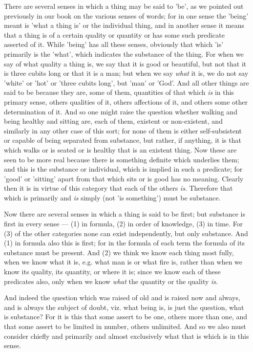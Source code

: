 There are several senses in which a thing may be said to 'be', as we pointed out previously in our book on the various senses of words; for in one sense the 'being' meant is 'what a thing is' or the individual thing, and in another sense it means that a thing is of a certain quality or quantity or has some such predicate asserted of it. While 'being' has all these senses, obviously that which 'is' primarily is the 'what', which indicates the substance of the thing. For when we say of what quality a thing is, we say that it is good or beautiful, but not that it is three cubits long or that it is a man; but when we say \emph{what} it is, we do not say 'white' or 'hot' or 'three cubits long', but 'man' or 'God'. And all other things are said to be because they are, some of them, quantities of that which \emph{is} in this primary sense, others qualities of it, others affections of it, and others some other determination of it. And so one might raise the question whether walking and being healthy and sitting are, each of them, existent or non-existent, and similarly in any other case of this sort; for none of them is either self-subsistent or capable of being separated from substance, but rather, if anything, it is that which walks or is seated or is healthy that is an existent thing. Now these are seen to be more real because there is something definite which underlies them; and this is the substance or individual, which is implied in such a predicate; for 'good' or 'sitting' apart from that which sits or is good has no meaning. Clearly then it is in virtue of this category that each of the others \emph{is}. Therefore that which is primarily and \emph{is} simply (not 'is something') must be substance.

Now there are several senses in which a thing is said to be first; but substance is first in every sense — (1) in formula, (2) in order of knowledge, (3) in time. For (3) of the other categories none can exist independently, but only substance. And (1) in formula also this is first; for in the formula of each term the formula of its substance must be present. And (2) we think we know each thing most fully, when we know what it is, e.g. what man is or what fire is, rather than when we know its quality, its quantity, or where it is; since we know each of these predicates also, only when we know \emph{what} the quantity or the quality \emph{is}.

And indeed the question which was raised of old and is raised now and always, and is always the subject of doubt, viz. what being is, is just the question, what is substance? For it is this that some assert to be one, others more than one, and that some assert to be limited in number, others unlimited. And so we also must consider chiefly and primarily and almost exclusively what that is which is in this sense.

